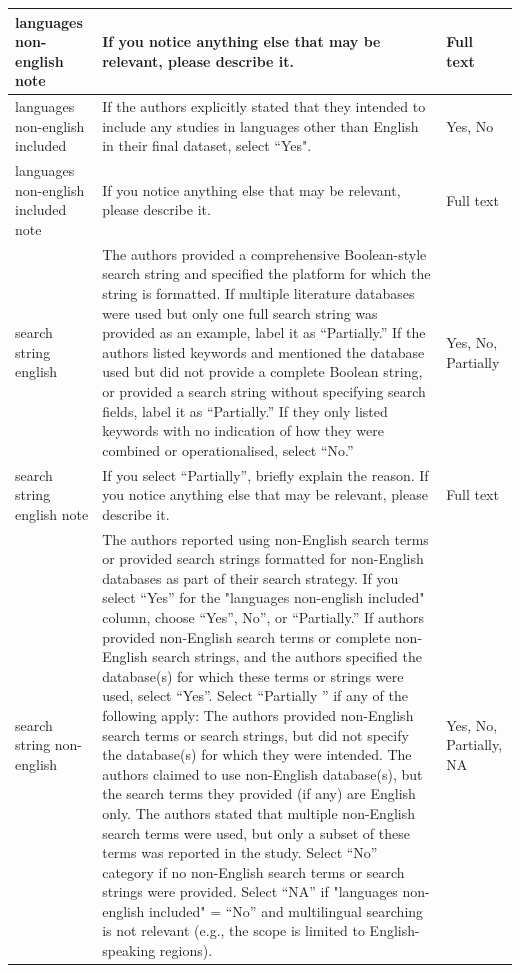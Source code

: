\documentclass{article}
\begin{document}
\begin{longtable}{p{2cm}|p{5.7cm}|p{2.75cm}}
        \hline
        languages non-english note & If you notice anything else that may be relevant, please describe it. & Full text \\
        \hline
        languages non-english included & If the authors explicitly stated that they intended to include any studies in languages other than English in their final dataset, select “Yes".  & Yes, No \\
        \hline
        languages non-english included note & If you notice anything else that may be relevant, please describe it. & Full text \\
        \hline
        search string english & The authors provided a comprehensive Boolean-style search string and specified the platform for which the string is formatted. If multiple literature databases were used but only one full search string was provided as an example, label it as “Partially.” If the authors listed keywords and mentioned the database used but did not provide a complete Boolean string, or provided a search string without specifying search fields, label it as “Partially.” If they only listed keywords with no indication of how they were combined or operationalised, select “No.”  & Yes, No, Partially \\
        \hline
        search string english note & If you select “Partially”, briefly explain the reason. If you notice anything else that may be relevant, please describe it. & Full text \\
        \hline
        search string non-english & The authors reported using non-English search terms or provided search strings formatted for non-English databases as part of their search strategy. If you select “Yes” for the "languages non-english included" column, choose “Yes”, No”, or “Partially.” If authors provided non-English search terms or complete non-English search strings, and the authors specified the database(s) for which these terms or strings were used, select “Yes”. Select “Partially ” if any of the following apply: The authors provided non-English search terms or search strings, but did not specify the database(s) for which they were intended. The authors claimed to use non-English database(s), but the search terms they provided (if any) are English only. The authors stated that multiple non-English search terms were used, but only a subset of these terms was reported in the study. Select “No” category if no non-English search terms or search strings were provided. Select “NA” if "languages non-english included" = “No” and multilingual searching is not relevant (e.g., the scope is limited to English-speaking regions).  & Yes, No, Partially, NA \\

\end{longtable}
\end{document}
